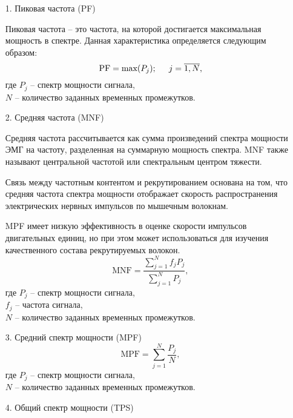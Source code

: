 \begin{itemize}[parsep=0.4em]
    \setlength\itemsep{0.8em plus 0.2em minus 0.2em}
    \item[1.] Пиковая частота (PF)

        Пиковая частота – это частота, на которой достигается максимальная мощность в спектре. Данная характеристика определяется следующим образом:
        \begin{equation}
            \text{PF} = \text{max}(P_j);\hspace{0.5cm} j=\overline{1,N},
        \end{equation}
        где $P_j$ -- спектр мощности сигнала,\\ \phantom{где} $N$ -- количество заданных временных промежутков.

    \item[2.] Средняя частота (MNF)


        Средняя частота рассчитывается как сумма произведений спектра мощности ЭМГ на частоту, разделенная на суммарную мощность спектра. MNF также называют центральной частотой или спектральным центром тяжести.

        Связь между частотным контентом и рекрутированием основана на том, что средняя частота спектра мощности отображает скорость распространения электрических нервных импульсов по мышечным волокнам.

        MPF имеет низкую эффективность в оценке скорости импульсов двигательных единиц, но при этом может использоваться для изучения качественного состава рекрутируемых волокон.
        \begin{equation}
            \text{MNF} = \dfrac{\sum\limits_{j=1}^N f_jP_j}{\sum\limits_{j=1}^N P_j},
        \end{equation} 
        где $P_j$ -- спектр мощности сигнала,\\ \phantom{где} $f_j$ -- частота сигнала,\\ \phantom{где} $N$ -- количество заданных временных промежутков.

    \item[3.] Средний спектр мощности (MPF)
        \begin{equation}
            \text{MPF} = \sum\limits_{j=1}^N\dfrac{P_j}{N},
        \end{equation}
        где $P_j$ -- спектр мощности сигнала,\\ \phantom{где} $N$ -- количество заданных временных промежутков.

    \item[4.] Общий спектр мощности (TPS)


\end{itemize}
